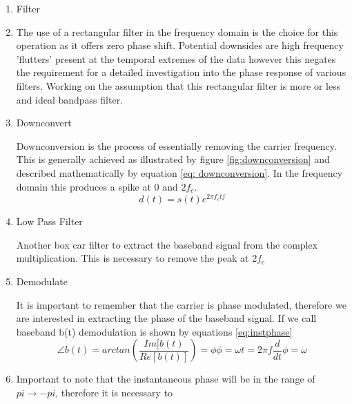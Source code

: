 \begin{enumerate}
    \item Filter

            \item The use of a rectangular filter in the frequency domain is the choice for this operation as it offers zero phase shift. Potential downsides are high frequency 'flutters' present at the temporal extremes of the data however this negates the requirement for a detailed investigation into the phase response of various filters. Working on the assumption that this rectangular filter is more or less and ideal bandpass filter.

    \item Downconvert

            Downconversion is the process of essentially removing the carrier frequency. This is generally achieved as illustrated by figure \ref{fig:downconversion} and described mathematically by equation \ref{eq: downconversion}. In the frequency domain this produces a spike at 0 and $2f_c$.
            \begin{equation}
                d(t) = s(t) e^{2 \pi f_c t j}
                \label{eq: downconversion}
            \end{equation}

    \item Low Pass Filter 

            Another box car filter to extract the baseband signal from the complex multiplication. This is necessary to remove the peak at $2f_c$

    \item Demodulate

            It is important to remember that the carrier is phase modulated, therefore
            we are interested in extracting the phase of the baseband signal. If we call baseband b(t) demodulation is shown by equations \ref{eq:instphase}
            \begin{subequations}
                \begin{equation}
                    \angle b(t) = arctan\left(\frac{Im[b(t)}{Re[b(t)]}\right) = \phi
                \end{equation}
                \begin{equation}
                    \phi = \omega t = 2\pi f
                    \label{eq:omega}
                \end{equation}
                \begin{equation}
                    \frac{d}{dt}\phi = \omega
                    \label{eq:instfeq}
                \end{equation}
                \label{eq:instphase}
            \end{subequations}
            \item Important to note that the instantaneous phase will be in the range of $pi \rightarrow -pi$, therefore it is necessary to
        \end{enumerate}


